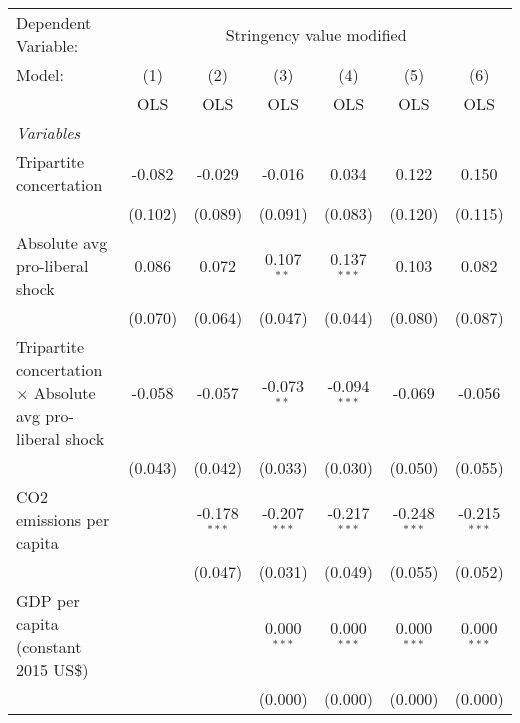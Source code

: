 
\begingroup
\centering
\begin{tabular}{lcccccc}
   \toprule
   Dependent Variable: & \multicolumn{6}{c}{Stringency value modified}\\
   Model:                                                           & (1)     & (2)            & (3)            & (4)            & (5)            & (6)\\  
                                                                    &  OLS    & OLS            & OLS            & OLS            & OLS            & OLS\\  
   \midrule
   \emph{Variables}\\
   Tripartite concertation                                          & -0.082  & -0.029         & -0.016         & 0.034          & 0.122          & 0.150\\   
                                                                    & (0.102) & (0.089)        & (0.091)        & (0.083)        & (0.120)        & (0.115)\\   
   Absolute avg pro-liberal shock                                   & 0.086   & 0.072          & 0.107$^{**}$   & 0.137$^{***}$  & 0.103          & 0.082\\   
                                                                    & (0.070) & (0.064)        & (0.047)        & (0.044)        & (0.080)        & (0.087)\\   
   Tripartite concertation $\times$ Absolute avg pro-liberal shock  & -0.058  & -0.057         & -0.073$^{**}$  & -0.094$^{***}$ & -0.069         & -0.056\\   
                                                                    & (0.043) & (0.042)        & (0.033)        & (0.030)        & (0.050)        & (0.055)\\   
   CO2 emissions per capita                                         &         & -0.178$^{***}$ & -0.207$^{***}$ & -0.217$^{***}$ & -0.248$^{***}$ & -0.215$^{***}$\\   
                                                                    &         & (0.047)        & (0.031)        & (0.049)        & (0.055)        & (0.052)\\   
   GDP per capita (constant 2015 US\$)                              &         &                & 0.000$^{***}$  & 0.000$^{***}$  & 0.000$^{***}$  & 0.000$^{***}$\\   
                                                                    &         &                & (0.000)        & (0.000)        & (0.000)        & (0.000)\\   

\end{tabular}

